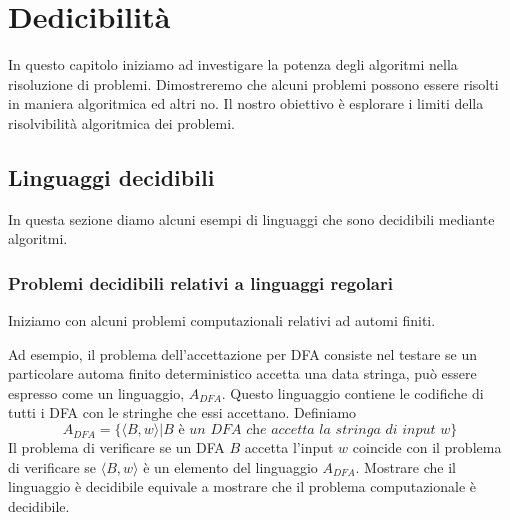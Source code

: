 \chapter{Dedicibilità}
In questo capitolo iniziamo ad investigare la potenza degli algoritmi nella risoluzione di problemi. Dimostreremo che alcuni problemi possono essere risolti in maniera algoritmica ed altri no. Il nostro obiettivo è esplorare i limiti della risolvibilità algoritmica dei problemi.

\section{Linguaggi decidibili}
In questa sezione diamo alcuni esempi di linguaggi che sono decidibili mediante algoritmi.

\subsection{Problemi decidibili relativi a linguaggi regolari}
Iniziamo con alcuni problemi computazionali relativi ad automi finiti. 

Ad esempio, il problema dell'accettazione per DFA consiste nel testare se un particolare automa finito deterministico accetta una data stringa, può essere espresso come un linguaggio, $A_{DFA}$. Questo linguaggio contiene le codifiche di tutti i DFA con le stringhe che essi accettano. Definiamo
\begin{equation*}
A_{DFA}=\{\langle B, w\rangle | B \textit{ è un DFA che accetta la stringa di input }w\}
\end{equation*}
Il problema di verificare se un DFA $B$ accetta l'input $w$ coincide con il problema di verificare se $\langle B, w\rangle $ è un elemento del linguaggio $A_{DFA}$. Mostrare che il linguaggio è decidibile equivale a mostrare che il problema computazionale è decidibile.

